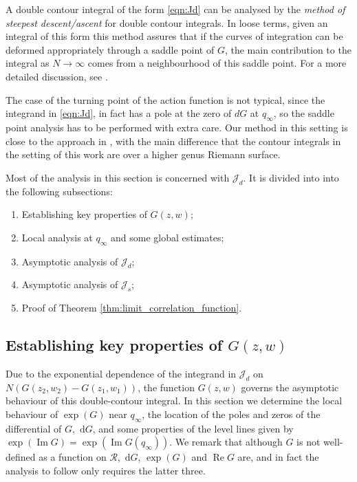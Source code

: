 \documentclass[11pt]{article}
\theoremstyle{plain}
\theoremstyle{definition}
\numberwithin{equation}{section}
\renewcommand{\d}{\,\mathrm{d}}
\DeclareMathOperator{\im}{Im}
\DeclareMathOperator{\re}{Re}
\begin{document}
A double contour integral of the form \eqref{eqn:Jd} can be analysed by the \textit{method of steepest descent/ascent} for double contour integrals. In loose terms, given an integral of this form this method assures that if the curves of integration can be deformed appropriately through a saddle point of $G$, the main contribution to the integral as $N\rightarrow\infty$ comes from a neighbourhood of this saddle point. For a more detailed discussion, see \cite{BB23, Oko03, OR03}.

The case of the turning point of the action function is not typical, since the integrand in \eqref{eqn:Jd}, in fact has a pole at the zero of $dG$ at $q_{\infty}$, so the saddle point analysis has to be performed with extra care. Our method in this setting is close to the approach in  \cite{JN06, OR06}, with the main difference that the contour integrals in the setting of this work are over a higher genus Riemann surface.

Most of the analysis in this section is concerned with $\mathcal{J}_d$. It is divided into
% 
into the following subsections:
%
\begin{enumerate}
\item[\ref{sec:properties_G}:]  Establishing key properties of $G(z,w)$;
%
%
\item[\ref{sec:local_analysis}:] Local analysis at $q_{\infty}$ and some global estimates;
%
\item[\ref{sec:Jd}:]  Asymptotic analysis of $\mathcal{J}_d$;
\item[\ref{sec:Js}:] Asymptotic analysis of $\mathcal{J}_s$;
\item[\ref{sec:proof}:] Proof of Theorem \ref{thm:limit_correlation_function}.
\end{enumerate}
%













\subsection{Establishing key properties of $G(z,w)$}\label{sec:properties_G}
%

%
Due to the exponential dependence of the integrand in $\mathcal{J}_d$ on $N(G(z_2,w_2)-G(z_1,w_1))$, the function $G(z,w)$ governs the asymptotic behaviour of this double-contour integral. In this section we determine the local behaviour of $\exp(G)$ near $q_{\infty}$, the location of the poles and zeros of the differential of $G$, $\d G$, and some properties of the level lines given by $\exp(\im G)=\exp(\im G(q_{\infty}))$. We remark that although $G$ is not well-defined as a function on $\mathcal{R}$, $\d G$, $\exp(G)$ and $\re G$ are, and in fact the analysis to follow only requires the latter three.   
\end{document}
